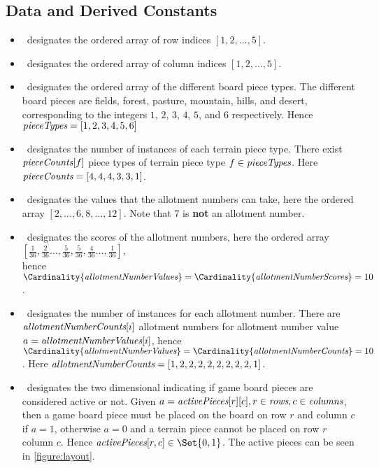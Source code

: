\documentclass[a4paper,11pt]{article}
\begin{document}
\subsection{Data and Derived Constants}
\begin{itemize}
\item \Rows~designates the ordered array of row indices $[1,2,\dots,5]$.

\item \Cols~designates the ordered array of column indices $[1,2,\dots,5]$.

\item \PieceTypes~designates the ordered array of the different board piece types. The different board pieces are fields, forest, pasture, mountain, hills, and desert, corresponding to the integers $1$, $2$, $3$, $4$, $5$, and $6$ respectively. Hence $\textit{pieceTypes}=[1,2,3,4,5,6]$

\item \PieceTypesCounts~designates the number of instances of each terrain piece type. There exist $\textit{pieceCounts}[f]$ piece types of terrain piece type $f \in \textit{pieceTypes}$. Here $\textit{pieceCounts} = [4,4,4,3,3,1]$.

\item \AllotmentNumberValues~designates the values that the allotment numbers can take, here the ordered array $[2,\dots,6,8,\dots,12]$. Note that $7$ is \textbf{not} an allotment number.

\item \AllotmentNumberScores~designates the scores of the allotment numbers, here the ordered array $[\frac{1}{36},\frac{2}{36}\dots,\frac{5}{36},\frac{5}{36},\frac{4}{36}\dots,\frac{1}{36}]$, \\ hence $\Cardinality{\AllotmentNumberValues} = \Cardinality{\AllotmentNumberScores} = 10$. 

\item \AllotmentNumberCounts~designates the number of instances for each allotment number. There are $\textit{allotmentNumberCounts}[i]$ allotment numbers for allotment number value $a = \textit{allotmentNumberValues}[i]$, hence $\Cardinality{\AllotmentNumberValues} = \Cardinality{\AllotmentNumberCounts} = 10$. Here $\textit{allotmentNumberCounts} = [1,2,2,2,2,2,2,2,2,1]$.

\item \ActivePieces~designates the two dimensional indicating if game board pieces are considered active or not. Given $a = \textit{activePieces}[r][c], r \in \textit{rows}, c \in \textit{columns}$, then a game board piece must be placed on the board on row $r$ and column $c$ if $a=1$, otherwise $a = 0$ and a terrain piece cannot be placed on row $r$ column $c$. Hence $\ActivePieces[r,c] \in \Set{0,1}$. The active pieces can be seen in \ref{figure:layout}.


\end{itemize}
\end{document}
